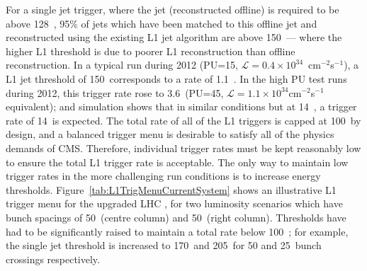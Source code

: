 For a single jet trigger, where the jet (reconstructed offline) is required to be above 128~\GeV, 95\% of jets which have been matched to this offline jet and reconstructed using the existing \ac{L1} jet algorithm are above 150~\GeV --- where the higher \ac{L1} threshold is due to poorer \ac{L1} reconstruction than offline reconstruction. 
In a typical  run during 2012 (PU=15, $\mathcal{L}=0.4 \times 10^{34}$~cm$^{-2}$s$^{-1}$), a \ac{L1} jet threshold of 150~\GeV corresponds to a rate of 1.1~\kHz.
In the high \ac{PU} test runs during 2012, 
this trigger rate rose to 3.6~\kHz (PU=45, $\mathcal{L}=1.1 \times 10^{34}$cm$^{-2}$s$^{-1}$ equivalent); and simulation shows that in similar conditions but at 14~\TeV, a trigger rate of 14~\kHz is expected.
The total rate of all of the \ac{L1} triggers is capped at 100~\kHz by design, 
and a balanced trigger menu is desirable to satisfy all of the physics demands of \ac{CMS}.
Therefore, individual trigger rates must be kept reasonably low to ensure the total \ac{L1} trigger rate is acceptable.  
The only way to maintain low trigger rates in the more challenging run conditions is to increase energy thresholds.
Figure~\ref{tab:L1TrigMenuCurrentSystem} shows an illustrative \ac{L1} trigger menu for the upgraded \ac{LHC} , for two luminosity scenarios which have bunch spacings of 50~\ns (centre column) and 50~\ns (right column). 
Thresholds have had to be significantly raised to maintain a total rate below 100~\kHz; for example, the single jet threshold is increased  to 170~\GeV and 205~\GeV for 50 and 25~\ns bunch crossings respectively.


